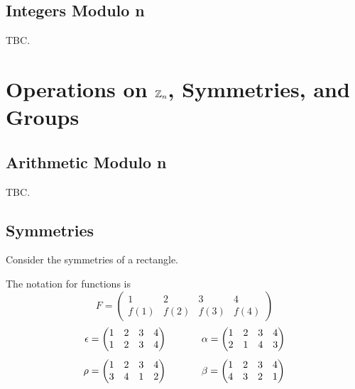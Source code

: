 \documentclass[openany]{report}
\begin{document}
\section{Integers Modulo n}
TBC.

\chapter{Operations on $\mathbb{Z}_n$, Symmetries, and Groups}
\section{Arithmetic Modulo n}
TBC.
\section{Symmetries}
Consider the symmetries of a rectangle.\\
\begin{center}
\end{center}
The notation for functions is 
$$F = \begin{pmatrix}
1 & 2 & 3 & 4\\
f(1) & f(2) & f(3) & f(4)
\end{pmatrix}$$
\begin{align*}
    \epsilon = \begin{pmatrix}
        1 & 2 & 3 & 4\\
        1 & 2 & 3 & 4
    \end{pmatrix} \hspace{0.5in}& 
    \alpha = \begin{pmatrix}
        1 & 2 & 3 & 4\\
        2 & 1 & 4 & 3
    \end{pmatrix}\\[1ex]
    \rho = \begin{pmatrix}
        1 & 2 & 3 & 4\\
        3 & 4 & 1 & 2
    \end{pmatrix} \hspace{0.5in}&
    \beta = \begin{pmatrix}
        1 & 2  & 3 & 4\\
        4 & 3 & 2 & 1
    \end{pmatrix}
\end{align*}
\end{document}
